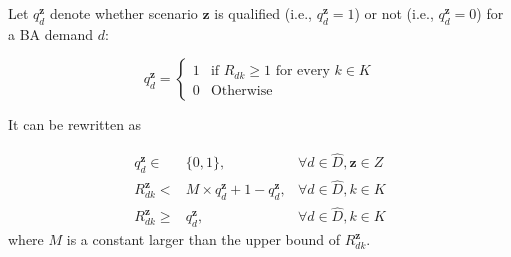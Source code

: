 \documentclass[sigconf]{acmart}
\begin{document}
\begin{appendices}
Let $q_d^{\mathbf{z}}$ denote whether scenario $\mathbf{z}$ is qualified (i.e., $q_d^{\mathbf{z}}=1$) or not (i.e., $q_d^{\mathbf{z}}=0$) for a BA demand $d$:

\begin{equation*}
q_d^{\mathbf{z}}=
\begin{cases}
1 &\text{if $R_{dk} \ge 1$ for every $k \in K$}\\
0 &\text{Otherwise}
\end{cases}
\label{CA}
\end{equation*}

%


It can be rewritten as

\begin{equation}
\label{A-z2}
\begin{array}{rll}
q_d^{\mathbf{z}} \in &\!\!\{0,1\}, &{\forall d \in \hat{D}, \mathbf{z} \in Z} \\
R_{dk}^{\mathbf{z}} < &\!\! M\times q_d^{\mathbf{z}}+1-q_d^{\mathbf{z}}, &{\forall d \in \hat{D},  k\in K} \\
R_{dk}^{\mathbf{z}} \ge &\!\!  q_d^{\mathbf{z}}, &{\forall d \in \hat{D},  k\in K}
\end{array}
\end{equation}
where $M$ is a constant larger than the upper bound of $R_{dk}^{\mathbf{z}}$.


\end{appendices}
\end{document}
